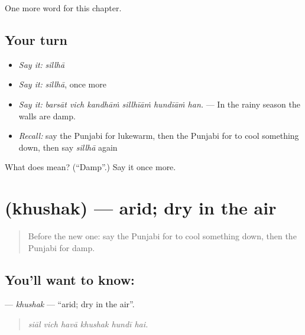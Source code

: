 \begin{grammarlens}[title={What you've built}]
One more word for this chapter.
\end{grammarlens}

\subsection*{Your turn}
\begin{itemize}
\raggedright
  \item \emph{Say it:} \emph{sillhā}
  \item \emph{Say it:} \emph{sillhā}, once more
  \item \emph{Say it:} \emph{barsāt vich kandhāṁ sillhīāṁ hundīāṁ han.} — In the rainy season the walls are damp.
  \item \emph{Recall:} say the Punjabi for lukewarm, then the Punjabi for to cool something down, then say \emph{sillhā} again
\end{itemize}

\begin{tcolorbox}[breakable,colback=teal!4,colframe=teal!35!black,title={Before you move on}]
What does  mean? (\textquotedblleft{}Damp\textquotedblright{}.) Say it once more.
\end{tcolorbox}
\section[\texorpdfstring{\pa{ਖ਼ੁਸ਼ਕ} (khushak)}{ਖ਼ੁਸ਼ਕ (khushak)}]{ (khushak) — arid; dry in the air}

\label{lesson:PA-C292-khushak}



\begin{quote}
Before the new one: say the Punjabi for to cool something down, then the Punjabi for damp.
\end{quote}

\subsection*{You'll want to know: }
\textbf{} — \emph{khushak} — \textquotedblleft{}arid; dry in the air\textquotedblright{}.

\begin{quote}
     
\end{quote}

\begin{quote}
\emph{siāl vich havā khushak hundī hai.}
\end{quote}

